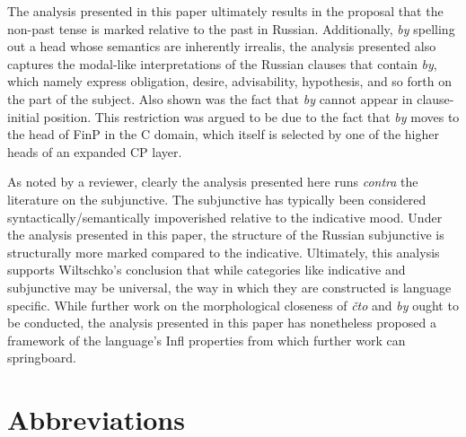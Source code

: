 \documentclass[output=paper,
modfonts,
newtxmath,
hidelinks,
]{langscibook}
\begin{document}
The analysis presented in this paper ultimately results in the proposal that the non-past tense is marked relative to the past in Russian. Additionally, \textit{by} spelling out a head whose semantics are inherently irrealis, the analysis presented also captures the modal-like interpretations of the Russian clauses that contain \textit{by}, which namely express obligation, desire, advisability, hypothesis, and so forth on the part of the subject. Also shown was the fact that \textit{by} cannot appear in clause-initial position. This restriction was argued to be due to the fact that \textit{by} moves to the head of FinP in the C domain, which itself is selected by one of the higher heads of an expanded CP layer. 

As noted by a reviewer, clearly the analysis presented here runs \textit{contra} the literature on the subjunctive. The subjunctive has typically been considered syntactically/semantically impoverished relative to the indicative mood. Under the analysis presented in this paper, the structure of the Russian subjunctive is structurally more marked compared to the indicative. Ultimately, this analysis supports Wiltschko’s conclusion that while categories like indicative and subjunctive may be universal, the way in which they are constructed is language specific. While further work on the morphological closeness of \textit{čto} and \textit{by} ought to be conducted, the analysis presented in this paper has nonetheless proposed a framework of the language’s Infl properties from which further work can springboard.




\section*{Abbreviations}
\end{document}
